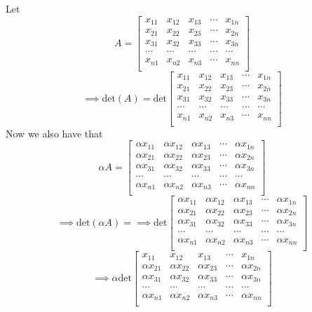 \documentclass[letterpaper,12pt]{article}
\theoremstyle{definition}
\begin{document}
Let 
\[ A = 
\begin{bmatrix}
    x_{11} & x_{12} & x_{13} & \cdots & x_{1n} \\
    x_{21} & x_{22} & x_{23} & \cdots & x_{2n} \\
    x_{31} & x_{32} & x_{33} & \cdots & x_{3n} \\
    \cdots&\cdots&\cdots &\cdots &\cdots\\
    x_{n1} & x_{n2} & x_{n3} & \cdots & x_{nn} \\
\end{bmatrix}
\]
\[\implies \text{det}(A)  = 
\text{det}
\begin{bmatrix}
    x_{11} & x_{12} & x_{13} & \cdots & x_{1n} \\
    x_{21} & x_{22} & x_{23} & \cdots & x_{2n} \\
    x_{31} & x_{32} & x_{33} & \cdots & x_{3n} \\
    \cdots&\cdots&\cdots &\cdots &\cdots\\
    x_{n1} & x_{n2} & x_{n3} & \cdots & x_{nn} \\
\end{bmatrix}
\]
Now we also have that
\[ \alpha A = 
\begin{bmatrix}
    \alpha x_{11} &\alpha x_{12} &\alpha x_{13} & \cdots &\alpha x_{1n} \\
   \alpha x_{21} &\alpha x_{22} &\alpha x_{23} & \cdots &\alpha x_{2n} \\
   \alpha x_{31} &\alpha x_{32} &\alpha x_{33} & \cdots &\alpha x_{3n} \\
    \cdots&\cdots&\cdots &\cdots &\cdots\\
   \alpha x_{n1} &\alpha x_{n2} &\alpha x_{n3} & \cdots &\alpha x_{nn} \\
\end{bmatrix}
\]
\[\implies \text{det}( \alpha A) = 
\implies
\text{det}
\begin{bmatrix}
    \alpha x_{11} &\alpha x_{12} &\alpha x_{13} & \cdots &\alpha x_{1n} \\
   \alpha x_{21} &\alpha x_{22} &\alpha x_{23} & \cdots &\alpha x_{2n} \\
   \alpha x_{31} &\alpha x_{32} &\alpha x_{33} & \cdots &\alpha x_{3n} \\
    \cdots&\cdots&\cdots &\cdots &\cdots\\
   \alpha x_{n1} &\alpha x_{n2} &\alpha x_{n3} & \cdots &\alpha x_{nn} \\
\end{bmatrix}
\]
\[
\implies
\alpha \text{det}
\begin{bmatrix}
     x_{11} & x_{12} &x_{13} & \cdots &x_{1n} \\
   \alpha x_{21} &\alpha x_{22} &\alpha x_{23} & \cdots &\alpha x_{2n} \\
   \alpha x_{31} &\alpha x_{32} &\alpha x_{33} & \cdots &\alpha x_{3n} \\
    \cdots&\cdots&\cdots &\cdots &\cdots\\
   \alpha x_{n1} &\alpha x_{n2} &\alpha x_{n3} & \cdots &\alpha x_{nn} \\
\end{bmatrix}
\]
\end{document}
